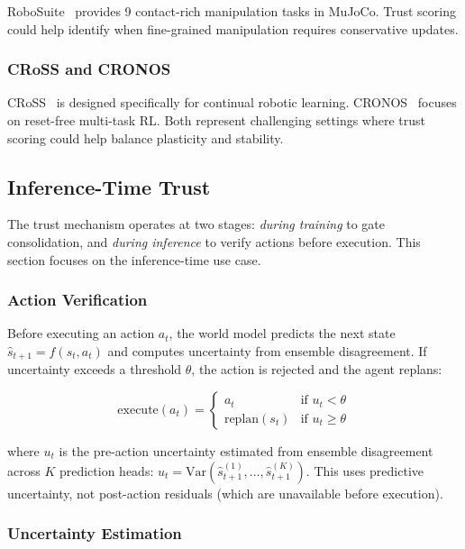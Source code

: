 \documentclass{article}
\begin{document}
RoboSuite~\cite{robosuite2019} provides 9 contact-rich manipulation tasks in MuJoCo. Trust scoring could help identify when fine-grained manipulation requires conservative updates.

\subsubsection{CRoSS and CRONOS}

CRoSS~\cite{cross2026} is designed specifically for continual robotic learning. CRONOS~\cite{cronos2024} focuses on reset-free multi-task RL. Both represent challenging settings where trust scoring could help balance plasticity and stability.

\subsection{Inference-Time Trust}

The trust mechanism operates at two stages: \emph{during training} to gate consolidation, and \emph{during inference} to verify actions before execution. This section focuses on the inference-time use case.

\subsubsection{Action Verification}

Before executing an action $a_t$, the world model predicts the next state $\hat{s}_{t+1} = f(s_t, a_t)$ and computes uncertainty from ensemble disagreement. If uncertainty exceeds a threshold $\theta$, the action is rejected and the agent replans:

\begin{equation}
\text{execute}(a_t) = \begin{cases}
a_t & \text{if } u_t < \theta \\
\text{replan}(s_t) & \text{if } u_t \geq \theta
\end{cases}
\end{equation}

where $u_t$ is the pre-action uncertainty estimated from ensemble disagreement across $K$ prediction heads: $u_t = \text{Var}(\hat{s}_{t+1}^{(1)}, \ldots, \hat{s}_{t+1}^{(K)})$. This uses predictive uncertainty, not post-action residuals (which are unavailable before execution).

\subsubsection{Uncertainty Estimation}
\end{document}
